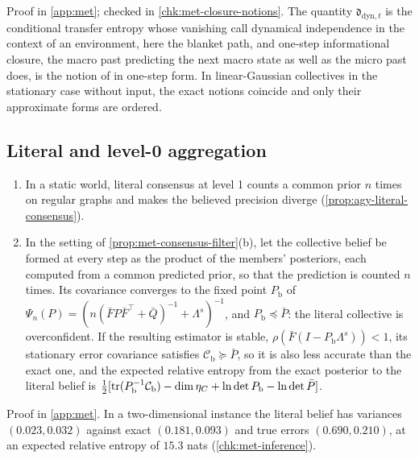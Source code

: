 Proof in \cref{app:met}; checked in \cref{chk:met-closure-notions}. The quantity $\mathfrak d_{\mathrm{dyn},t}$ is the conditional transfer entropy whose vanishing \citet{barnett2023dynamical} call dynamical independence in the context of an environment, here the blanket path, and one-step informational closure, the macro past predicting the next macro state as well as the micro past does, is the notion of \citet{rosas2024software} in one-step form. In linear-Gaussian collectives in the stationary case without input, the exact notions coincide and only their approximate forms are ordered.

\subsection{Literal and level-0 aggregation}\label{sup:met-literal-and-level-0-aggregation}

\begin{proposition}\label{prop:met-literal-aggregation}
\begin{enumerate}
\item[(a)] In a static world, literal consensus at level 1 counts a common prior $n$ times on regular graphs and makes the believed precision diverge (\cref{prop:agy-literal-consensus}).
\item[(b)] In the setting of \cref{prop:met-consensus-filter}(b), let the collective belief be formed at every step as the product of the members' posteriors, each computed from a common predicted prior, so that the prediction is counted $n$ times. Its covariance converges to the fixed point $P_{\mathrm b}$ of $\Psi_n(P)=(n(\bar FP\bar F^\top+\bar Q)^{-1}+\Lambda^s)^{-1}$, and $P_{\mathrm b}\preceq\bar P$: the literal collective is overconfident. If the resulting estimator is stable, $\rho(\bar F(I-P_{\mathrm b}\Lambda^s))<1$, its stationary error covariance satisfies $\mathcal C_{\mathrm b}\succeq\bar P$, so it is also less accurate than the exact one, and the expected relative entropy from the exact posterior to the literal belief is $\frac12[\operatorname{tr}(P_{\mathrm b}^{-1}\mathcal C_{\mathrm b})-\dim\eta_C+\ln\det P_{\mathrm b}-\ln\det\bar P]$.
\end{enumerate}
\end{proposition}
Proof in \cref{app:met}. In a two-dimensional instance the literal belief has variances $(0.023,0.032)$ against exact $(0.181,0.093)$ and true errors $(0.690,0.210)$, at an expected relative entropy of $15.3$ nats (\cref{chk:met-inference}).

